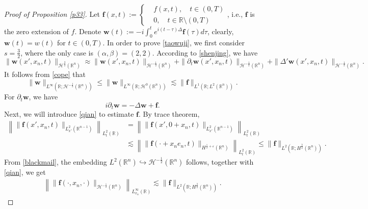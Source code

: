 \documentclass[preprint,compress,12pt]{elsarticle}
\numberwithin{equation}{section}
\begin{document}
\begin{proof}[Proof of Proposition \ref{p33}]
	Let $\boldsymbol{f}(x,t):=\left\{\begin{aligned}&f(x,t), \quad t\in (0,T)\\
		&0, \quad t\in\mathbb{R}\setminus (0,T)\end{aligned}\right.$, i.e., $\boldsymbol{f}$ is the zero extension of $f$. Denote $\boldsymbol{w}(t):=-i \int_{0}^{t}e^{i(t-\tau)\Delta}\boldsymbol{f}(\tau)d\tau$, clearly, $\boldsymbol{w}(t)=w(t)$ for $t\in (0,T)$. In order to prove \eqref{taowuji}, we first consider $s=\frac{3}{2}$, where the only case is $(\alpha,\beta)=(2,2)$. According to \eqref{shenjing}, we have
	{\small\begin{equation}\label{sj} \|\boldsymbol{w}(x',x_{n},t)\|_{\mathcal{H}^{\frac{3}{2}}(\mathbb{R}^{n})}\approx\|\boldsymbol{w}(x',x_{n},t)\|_{\mathcal{H}^{-\frac{1}{2}}(\mathbb{R}^{n})}+\|\partial_{t}\boldsymbol{w}(x',x_{n},t)\|_{\mathcal{H}^{-\frac{1}{2}}(\mathbb{R}^{n})}+\|\Delta'\boldsymbol{w}(x',x_{n},t)\|_{\mathcal{H}^{-\frac{1}{2}}(\mathbb{R}^{n})}.
	\end{equation}}
	It follows from \eqref{cope} that
	\begin{equation}\label{fir} \|\boldsymbol{w}\|_{L^{\infty}(\mathbb{R};\mathcal{H}^{-\frac{1}{2}}(\mathbb{R}^{n}))}\leq \|\boldsymbol{w}\|_{L^{\infty}\left(\mathbb{R};\mathcal{H}^{0}(\mathbb{R}^{n})\right)}\lesssim\|\boldsymbol{f}\|_{L^{1}(\mathbb{R};L^{2}(\mathbb{R}^{n}))}.
	\end{equation}
	For $\partial_{t}\boldsymbol{w}$, we have
	\begin{equation}\label{wf}
		i\partial_{t}\boldsymbol{w}=-\Delta \boldsymbol{w}+\boldsymbol{f}.
	\end{equation}
	Next, we will introduce \eqref{qian} to estimate $\boldsymbol{f}$. By trace theorem,
	\begin{equation} \label{qian}
		\begin{aligned}
			\left \| \|\boldsymbol{f}(x',x_{n},t)\|_{L_{x'}^{2}(\mathbb{R}^{n-1})}  \right\|_{L_{t}^{2}(\mathbb{R})} &= \left \| \|\boldsymbol{f}(x',0+x_{n},t)\|_{L_{x'}^{2}(\mathbb{R}^{n-1})}  \right\|_{L_{t}^{2}(\mathbb{R})}\\&\lesssim   \left\|\|\boldsymbol{f}(\cdot+x_{n}e_{n},t)\|_{H^{\frac{1}{2}+\varepsilon} (\mathbb{R}^{n})}\right\|_{L_{t}^{2}(\mathbb{R})}\leq \|\boldsymbol{f}\|_{L^{2}(\mathbb{R};H^{\frac{3}{2}}(\mathbb{R}^{n}))} .
		\end{aligned}
	\end{equation}
	From \eqref{blackmail}, the embedding   $L^{2}(\mathbb{R}^{n})\hookrightarrow\mathcal{H}^{-\frac{1}{2}}(\mathbb{R}^{n})$ follows, together with \eqref{qian}, we get
	\begin{equation}\label{batter}
		\begin{aligned}	\left\|\|\boldsymbol{f}(\cdot,x_{n},\cdot)\|_{\mathcal{H}^{-\frac{1}{2}}(\mathbb{R}^{n})}\right\|_{L_{x_{n}}^{\infty}(\mathbb{R})}\lesssim\|\boldsymbol{f}\|_{L^{2}(\mathbb{R};H^{\frac{3}{2}}(\mathbb{R}^{n}))}.
		\end{aligned}
	\end{equation}
	

\end{proof}
\end{document}
